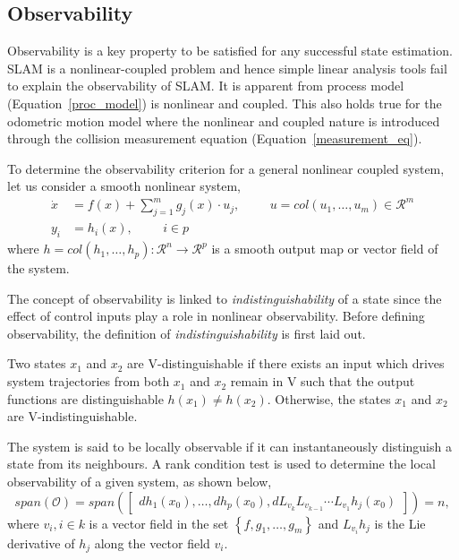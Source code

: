 \subsection{Observability}
Observability is a key property to be satisfied for any successful state estimation. SLAM is a nonlinear-coupled problem and hence simple linear analysis tools fail to explain the observability of SLAM. It is apparent from process model (Equation~\ref{proc_model}) is nonlinear and coupled. This also holds true for the odometric motion model where the nonlinear and coupled nature is introduced through the collision measurement equation (Equation~\ref{measurement_eq}). 

To determine the observability criterion for a general nonlinear coupled system, let us consider a smooth nonlinear system,
\begin{align*}
\dot{x} &= f(x)+\sum_{j=1}^m g_j(x)\cdot u_j, \hspace{1cm} u=col(u_1,\dots,u_m)\in\mathcal{R}^m\\
y_i &= h_i(x), \hspace{1cm} i\in p
\end{align*}
where $h=col(h_1,\dots,h_p):\mathcal{R}^n\rightarrow\mathcal{R}^p$ is a smooth output map or vector field of the system. 

The concept of observability is linked to \textit{indistinguishability} of a state since the effect of control inputs play a role in nonlinear observability. Before defining observability, the definition of \textit{indistinguishability} is first laid out.

\begin{rem}
Two states $x_1$ and $x_2$ are $\mathrm{V}$-distinguishable if there exists an input which drives system trajectories from both $x_1$ and $x_2$ remain in $\mathrm{V}$ such that the output functions are distinguishable $h(x_1)\neq h(x_2)$. Otherwise, the states $x_1$ and $x_2$ are $\mathrm{V}$-indistinguishable.
\end{rem}

The system is said to be locally observable if it can instantaneously distinguish a state from its neighbours. A rank condition test is used to determine the local observability of a given system, as shown below,
\begin{equation}
span(\mathcal{O}) = span(\begin{bmatrix}dh_1(x_0),\dots,dh_p(x_0),dL_{v_k}L_{v_{k-1}}\cdots L_{v_1}h_j(x_0)\end{bmatrix}) = n,
\end{equation}
where $v_i,i\in k$ is a vector field in the set $\left\lbrace f,g_1,\dots,g_m\right\rbrace$ and $L_{v_i}h_j$ is the Lie derivative of $h_j$ along the vector field $v_i$.

